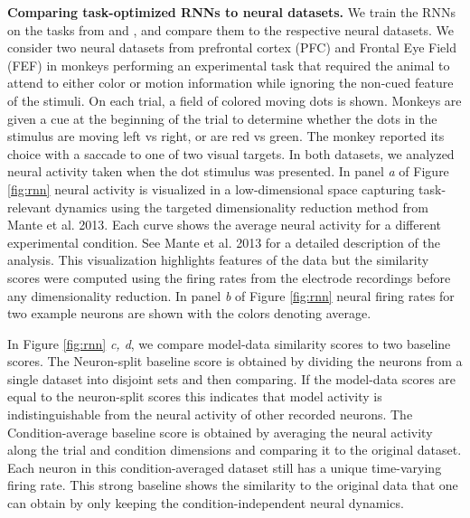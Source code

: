 \documentclass{article} %
\begin{document}
\textbf{Comparing task-optimized RNNs to neural datasets.}
We train the RNNs on the tasks from \citet{Mante2013} and \citet{Siegel2015}, and compare them to the respective neural datasets.
We consider two neural datasets from prefrontal cortex (PFC) \citep{Mante2013} and Frontal Eye Field (FEF) \citep{Siegel2015} in monkeys performing an experimental task that required the animal to attend to either color or motion information while ignoring the non-cued feature of the stimuli. 
On each trial, a field of colored moving dots is shown.  Monkeys are given a cue at the beginning of the trial to determine whether the dots in the stimulus are moving left vs right, or are red vs green. The monkey reported its choice with a saccade to one of two visual targets. In both datasets, we analyzed neural activity taken when the dot stimulus was presented. In panel \textit{a} of Figure \ref{fig:rnn} neural activity is visualized in a low-dimensional space capturing task-relevant dynamics using the targeted dimensionality reduction method from Mante et al. 2013. Each curve shows the average neural activity for a different experimental condition. See Mante et al. 2013 for a detailed description of the analysis. This visualization highlights features of the data but the similarity scores were computed using the firing rates from the electrode recordings before any dimensionality reduction. In panel \textit{b} of Figure \ref{fig:rnn} neural firing rates for two example neurons are shown with the colors denoting average.

In Figure \ref{fig:rnn} \textit{c, d}, we compare model-data similarity scores to two baseline scores.
The Neuron-split baseline score is obtained by dividing the neurons from a single dataset into disjoint sets and then comparing. If the model-data scores are equal to the neuron-split scores this indicates that model activity is indistinguishable from the neural activity of other recorded neurons. 
The Condition-average baseline score is obtained by averaging the neural activity along the trial and condition dimensions and comparing it to the original dataset. Each neuron in this condition-averaged dataset still has a unique time-varying firing rate. This strong baseline shows the similarity to the original data that one can obtain by only keeping the condition-independent neural dynamics. 


\end{document}
